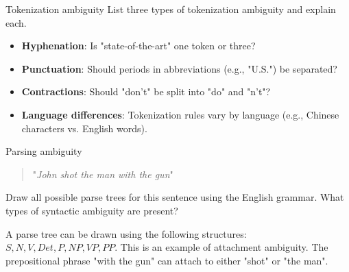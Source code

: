 \documentclass{article}
\author{Leopold Lemmermann}
\begin{document}
\createtitle

\setcounter{section}{2022}

\begin{exercise}{Tokenization ambiguity}\label{ex:tokenization}
  List three types of tokenization ambiguity and explain each.

  \begin{solution}
    \begin{itemize}
      \item \textbf{Hyphenation}: Is "state-of-the-art" one token or three?
      \item \textbf{Punctuation}: Should periods in abbreviations (e.g., "U.S.") be separated?
      \item \textbf{Contractions}: Should "don't" be split into "do" and "n't"?
      \item \textbf{Language differences}: Tokenization rules vary by language (e.g., Chinese characters vs. English words).
    \end{itemize}
  \end{solution}
\end{exercise}

\begin{exercise}{Parsing ambiguity}
  \begin{quote}\center "\textit{John shot the man with the gun}"\end{quote}
  Draw all possible parse trees for this sentence using the English grammar. What types of syntactic ambiguity are present?

  \begin{solution}
    A parse tree can be drawn using the following structures: $S, N, V, Det, P, NP, VP, PP$. This is an example of attachment ambiguity. The prepositional phrase "with the gun" can attach to either "shot" or "the man".
  \end{solution}
\end{exercise}
\end{document}
